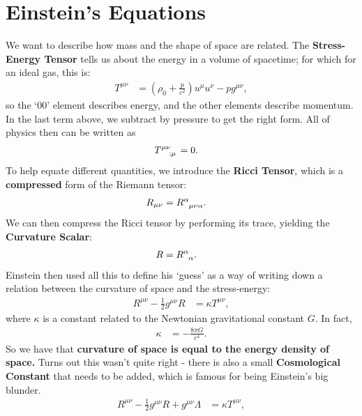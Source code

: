 \documentclass[a4paper, 11pt, normalem]{report}
\begin{document}
\section{Einstein's Equations}
We want to describe how mass and the shape of space are related.
The \textbf{Stress-Energy Tensor} tells us about the energy in a volume of spacetime; for which for an ideal gas, this is:
\begin{align}
    T^{\mu\nu} &= \left(\rho_0+\frac{p}{c^2}\right)u^\mu u^\nu - pg^{\mu\nu},
\end{align}
so the `00' element describes energy, and the other elements describe momentum.
In the last term above, we subtract by pressure to get the right form.
All of physics then can be written as
\begin{align}
    \tensor{T}{^{\mu\nu}_{;\mu}} &= 0.
\end{align}
To help equate different quantities, we introduce the \textbf{Ricci Tensor}, which is a \textbf{compressed} form of the Riemann tensor:
\begin{align}
    R_{\mu\nu} &= \tensor{R}{^\alpha_{\mu\nu\alpha}}.
\end{align}
We can then compress the Ricci tensor by performing its trace, yielding the \textbf{Curvature Scalar}:
\begin{align}
    R &= \tensor{R}{^\alpha_\alpha}.
\end{align}
Einstein then used all this to define his `guess' as a way of writing down a relation between the curvature of space and the stress-energy:
\begin{align}
    R^{\mu\nu}-\frac12 g^{\mu\nu}R &= \kappa T^{\mu\nu},
\end{align}
where $\kappa$ is a constant related to the Newtonian gravitational constant $G$. 
In fact, 
\begin{align}
    \kappa &= -\frac{8\pi G}{c^4}.
\end{align}
So we have that \textbf{curvature of space is equal to the energy density of space.}
Turns out this wasn't quite right - there is also a small \textbf{Cosmological Constant} that needs to be added, which is famous for being Einstein's big blunder.
\begin{align}
    R^{\mu\nu}-\frac12 g^{\mu\nu}R + g^{\mu\nu}\Lambda &= \kappa T^{\mu\nu},
\end{align}
\end{document}
